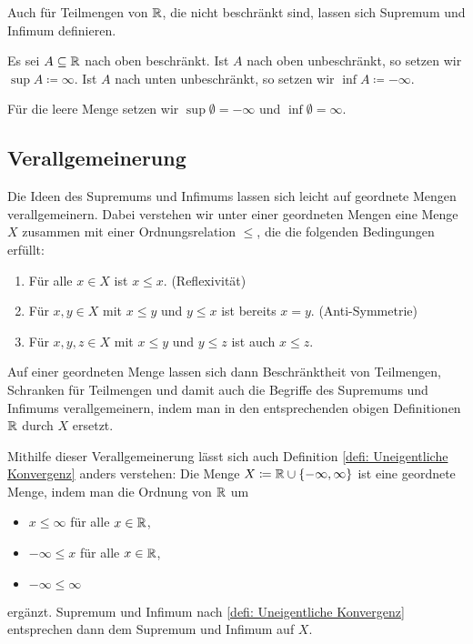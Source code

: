 \documentclass[a4paper,10pt]{article}
\begin{document}
Auch für Teilmengen von $\mathbb{R}$, die nicht beschränkt sind, lassen sich Supremum und Infimum definieren.


\begin{defi}\label{defi: Uneigentliche Konvergenz}
 Es sei $A \subseteq \mathbb{R}$ nach oben beschränkt. Ist $A$ nach oben unbeschränkt, so setzen wir $\sup A \coloneq \infty$. Ist $A$ nach unten unbeschränkt, so setzen wir $\inf A \coloneqq -\infty$.
 
 Für die leere Menge setzen wir $\sup \emptyset = -\infty$ und $\inf \emptyset = \infty$.
\end{defi}



\subsection{Verallgemeinerung}
Die Ideen des Supremums und Infimums lassen sich leicht auf geordnete Mengen verallgemeinern. Dabei verstehen wir unter einer geordneten Mengen eine Menge $X$ zusammen mit einer Ordnungsrelation $\leq$, die die folgenden Bedingungen erfüllt:
\begin{enumerate}
 \item
  Für alle $x \in X$ ist $x \leq x$. (Reflexivität)
 \item
  Für $x,y \in X$ mit $x \leq y$ und $y \leq x$ ist bereits $x = y$. (Anti-Symmetrie)
 \item
  Für $x,y,z \in X$ mit $x \leq y$ und $y \leq z$ ist auch $x \leq z$.
\end{enumerate}

Auf einer geordneten Menge lassen sich dann Beschränktheit von Teilmengen, Schranken für Teilmengen und damit auch die Begriffe des Supremums und Infimums verallgemeinern, indem man in den entsprechenden obigen Definitionen $\mathbb{R}$ durch $X$ ersetzt.

Mithilfe dieser Verallgemeinerung lässt sich auch Definition \ref{defi: Uneigentliche Konvergenz} anders verstehen: Die Menge $X \coloneqq \mathbb{R} \cup \{-\infty, \infty\}$ ist eine geordnete Menge, indem man die Ordnung von $\mathbb{R}$ um
\begin{itemize}
 \item
  $x \leq \infty$ für alle $x \in \mathbb{R}$,
 \item
  $-\infty \leq x$ für alle $x \in \mathbb{R}$,
 \item
  $-\infty \leq \infty$
\end{itemize}
ergänzt. Supremum und Infimum nach \ref{defi: Uneigentliche Konvergenz} entsprechen dann dem Supremum und Infimum auf $X$.
\end{document}

